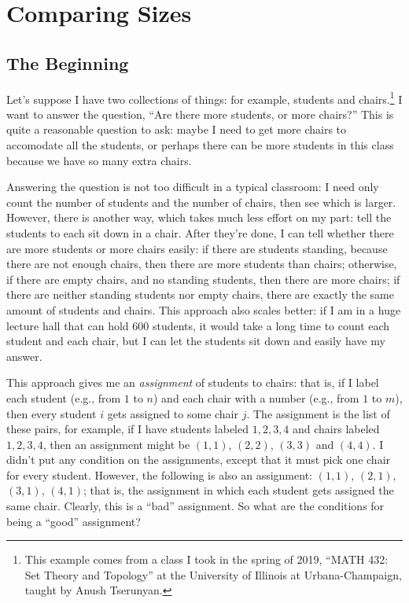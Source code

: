 \section{Comparing Sizes}

\subsection{The Beginning}

Let's suppose I have two collections of things: for example, students and chairs.\footnote{This example comes from a class I took in the spring of 2019, ``MATH 432: Set Theory and Topology'' at the University of Illinois at Urbana-Champaign, taught by Anush Tserunyan.}
I want to answer the question, ``Are there more students, or more chairs?''
This is quite a reasonable question to ask: maybe I need to get more chairs to accomodate all the students, or perhaps there can be more students in this class because we have so many extra chairs.

Answering the question is not too difficult in a typical classroom: I need only count the number of students and the number of chairs, then see which is larger.
However, there is another way, which takes much less effort on my part: tell the students to each sit down in a chair.
After they're done, I can tell whether there are more students or more chairs easily: if there are students standing, because there are not enough chairs, then there are more students than chairs; otherwise, if there are empty chairs, and no standing students, then there are more chairs; if there are neither standing students nor empty chairs, there are exactly the same amount of students and chairs.
This approach also scales better: if I am in a huge lecture hall that can hold 600 students, it would take a long time to count each student and each chair, but I can let the students sit down and easily have my answer.

This approach gives me an \emph{assignment} of students to chairs: that is, if I label each student (e.g., from $1$ to $n$) and each chair with a number (e.g., from $1$ to $m$), then every student $i$ gets assigned to some chair $j$.
The assignment is the list of these pairs, for example, if I have students labeled $1,2,3,4$ and chairs labeled $1,2,3,4$, then an assignment might be $(1,1)$, $(2,2)$, $(3,3)$ and $(4,4)$.
I didn't put any condition on the assignments, except that it must pick one chair for every student.
However, the following is also an assignment: $(1,1)$, $(2,1)$, $(3,1)$, $(4,1)$; that is, the assignment in which each student gets assigned the same chair.
Clearly, this is a ``bad'' assignment.
So what are the conditions for being a ``good'' assignment?

